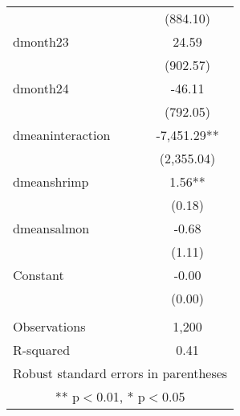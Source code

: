 \begin{tabular}{lc}
 & (884.10) \\
dmonth23 & 24.59 \\
 & (902.57) \\
dmonth24 & -46.11 \\
 & (792.05) \\
dmeaninteraction & -7,451.29** \\
 & (2,355.04) \\
dmeanshrimp & 1.56** \\
 & (0.18) \\
dmeansalmon & -0.68 \\
 & (1.11) \\
Constant & -0.00 \\
 & (0.00) \\
 &  \\
Observations & 1,200 \\
 R-squared & 0.41 \\ \hline
\multicolumn{2}{c}{ Robust standard errors in parentheses} \\
\multicolumn{2}{c}{ ** p$<$0.01, * p$<$0.05} \\
\end{tabular}
